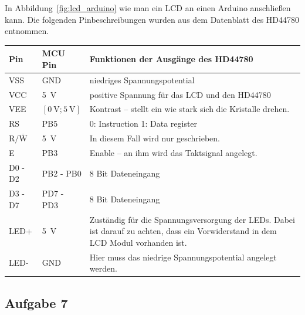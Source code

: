 \documentclass{article}
\begin{document}
In Abbildung~\ref{fig:lcd_arduino} wie man ein LCD an einen Arduino anschließen kann.
Die folgenden Pinbeschreibungen wurden aus dem Datenblatt des HD44780 entnommen.

\vspace{0.4cm}
\begin{tabularx}{\linewidth}{p{1.3cm} p{1.7cm}  X}
    \textbf{Pin} & \textbf{MCU Pin} & \textbf{Funktionen der Ausgänge des HD44780} \\
    \hline
    VSS & GND & niedriges Spannungspotential \\
    VCC & \SI{5}{\volt} & positive Spannung für das LCD und den HD44780 \\
    VEE & $[\SI{0}{\volt}; \SI{5}{\volt}]$ & Kontrast -- stellt ein wie stark sich die Kristalle drehen. \\
    RS & PB5 & 0: Instruction 1: Data register \\
    $\text{R/}\overline{\text{W}}$ & \SI{5}{\volt} & In diesem Fall wird nur geschrieben. \\
    E & PB3 & Enable -- an ihm wird das Taktsignal angelegt. \\
    D0 - D2 & PB2 - PB0 & 8 Bit Dateneingang \\
    D3 - D7 & PD7 - PD3 & 8 Bit Dateneingang \\
    LED+ & \SI{5}{\volt} & Zuständig für die Spannungsversorgung der LEDs. 
    Dabei ist darauf zu achten, dass ein Vorwiderstand in dem LCD Modul vorhanden ist. \\
    LED- & GND & Hier muss das niedrige Spannungspotential angelegt werden. \\
\end{tabularx}

\clearpage
\subsection{Aufgabe 7}

\clearpage

\end{document}
